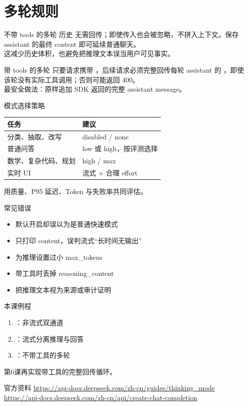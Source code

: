 \documentclass[aspectratio=169,UTF8]{ctexbeamer}
\begin{document}
\section{多轮规则}
\begin{frame}{不带 tools 的多轮}
历史  无需回传；即使传入也会被忽略，不拼入上下文。保存 assistant 的最终 content 即可延续普通聊天。\\[8pt]
这减少历史体积，也避免把推理文本误当用户可见事实。
\end{frame}
\begin{frame}{带 tools 的多轮}
只要请求携带 ，后续请求必须完整回传每轮 assistant 的 ，即使该轮没有实际工具调用；否则可能返回 400。\\[8pt]
最安全做法：原样追加 SDK 返回的完整 assistant message。
\end{frame}
\begin{frame}{模式选择策略}
\begin{tabular}{ll}
\toprule
任务 & 建议\\
\midrule
分类、抽取、改写 & disabled / none\\
普通问答 & low 或 high，按评测选择\\
数学、复杂代码、规划 & high / max\\
实时 UI & 流式 + 合理 effort\\
\bottomrule
\end{tabular}
用质量、P95 延迟、Token 与失败率共同评估。
\end{frame}
\begin{frame}{常见错误}
\begin{itemize}
  \item 默认开启却误以为是普通快速模式
  \item 只打印 content，误判流式“长时间无输出”
  \item 为推理设置过小 max\_tokens
  \item 带工具时丢掉 reasoning\_content
  \item 把推理文本视为来源或审计证明
\end{itemize}
\end{frame}
\begin{frame}{本课例程}
\begin{enumerate}
  \item {}：非流式双通道
  \item {}：流式分离推理与回答
  \item {}：不带工具的多轮
\end{enumerate}
第6课再实现带工具的完整回传循环。
\end{frame}
\begin{frame}{官方资料}
\small
\url{https://api-docs.deepseek.com/zh-cn/guides/thinking_mode}\\
\url{https://api-docs.deepseek.com/zh-cn/api/create-chat-completion}
\end{frame}
\end{document}
